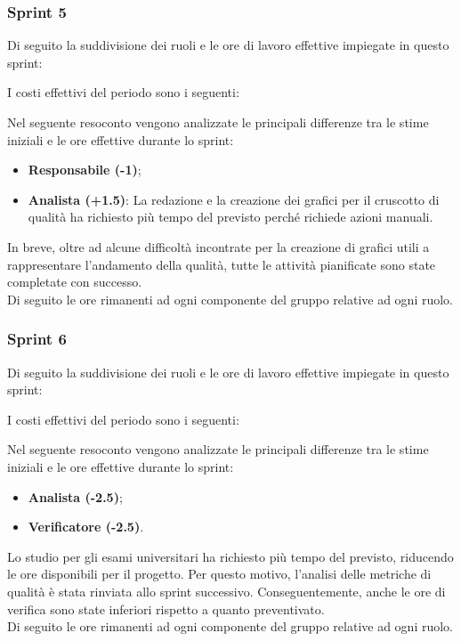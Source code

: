 \pagebreak
\subsubsection{Sprint 5}
Di seguito la suddivisione dei ruoli e le ore di lavoro effettive impiegate in
questo sprint:



I costi effettivi del periodo sono i seguenti:



Nel seguente resoconto vengono analizzate le principali differenze tra le stime iniziali e le ore effettive durante lo sprint:
\begin{itemize}
    \item \textbf{Responsabile (-1)};
    \item \textbf{Analista (+1.5)}: La redazione e la creazione dei grafici per il cruscotto di qualità ha richiesto più tempo del previsto perché richiede azioni manuali.
\end{itemize}
In breve, oltre ad alcune difficoltà incontrate per la creazione di grafici utili a rappresentare l'andamento della qualità, tutte le attività pianificate sono state completate con successo.\\
Di seguito le ore rimanenti ad ogni componente del gruppo relative ad ogni ruolo.


\pagebreak
\subsubsection{Sprint 6}
Di seguito la suddivisione dei ruoli e le ore di lavoro effettive impiegate in
questo sprint:



I costi effettivi del periodo sono i seguenti:



Nel seguente resoconto vengono analizzate le principali differenze tra le stime iniziali e le ore effettive durante lo sprint:
\begin{itemize}
    \item \textbf{Analista (-2.5)}; 
    \item \textbf{Verificatore (-2.5)}.
\end{itemize}
Lo studio per gli esami universitari ha richiesto più tempo del previsto, riducendo le ore disponibili per il progetto.
Per questo motivo, l'analisi delle metriche di qualità è stata rinviata allo sprint successivo. 
Conseguentemente, anche le ore di verifica sono state inferiori rispetto a quanto preventivato.\\
Di seguito le ore rimanenti ad ogni componente del gruppo relative ad ogni ruolo.


